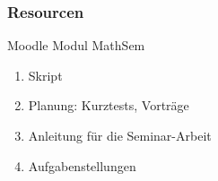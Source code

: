 %
%
%
\begin{frame}
\frametitle{Resourcen}
\begin{block}{Moodle Modul MathSem}
\begin{enumerate}
\item Skript
\item Planung: Kurztests, Vorträge
\item Anleitung für die Seminar-Arbeit
\item Aufgabenstellungen
\end{enumerate}
\end{block}
\end{frame}
